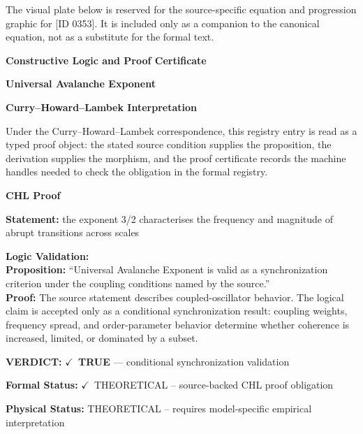 \begingroup\footnotesize\sloppy
The visual plate below is reserved for the source-specific equation and progression graphic for [ID 0353]. It is included only as a companion to the canonical equation, not as a substitute for the formal text.
\par\endgroup
\ifTZPDarkEdition
{}
\fi

\clearpage
\begingroup\tzpsupportsetup
\noindent\textbf{\fontsize{10.8pt}{12.8pt}\selectfont [ID 0353] Constructive Logic and Proof Certificate}\par
\noindent\textbf{\fontsize{10pt}{12pt}\selectfont Universal Avalanche Exponent}\par
\vspace{0.45em}
\begingroup
\footnotesize
\setlength{\parskip}{0.22em}
\setlength{\parindent}{0pt}
\noindent\textbf{Curry--Howard--Lambek Interpretation}\par
Under the Curry--Howard--Lambek correspondence, this registry entry is read as a typed proof
object: the stated source condition supplies the proposition, the derivation supplies the
morphism, and the proof certificate records the machine handles needed to check the obligation
in the formal registry.

\vspace{0.45em}
\noindent\textbf{CHL Proof}\par
\textbf{Statement:} the exponent 3/2 characterises the frequency and magnitude of abrupt transitions across
scales

\textbf{Logic Validation:}\\
\textbf{Proposition:} ``Universal Avalanche Exponent is valid as a synchronization criterion under the coupling
conditions named by the source.''\\
\textbf{Proof:} The source statement describes coupled-oscillator behavior. The logical claim is
accepted only as a conditional synchronization result: coupling weights, frequency
spread, and order-parameter behavior determine whether coherence is increased, limited,
or dominated by a subset.

\textbf{VERDICT:} \ensuremath{\checkmark}\ \textbf{TRUE} --- conditional synchronization validation

\textbf{Formal Status:} \ensuremath{\checkmark}\ THEORETICAL -- source-backed CHL proof obligation

\textbf{Physical Status:} THEORETICAL -- requires model-specific empirical interpretation
\par\vspace{0.45em}
\par
\ifTZPDarkEdition
{}
\fi
\endgroup
\endgroup

